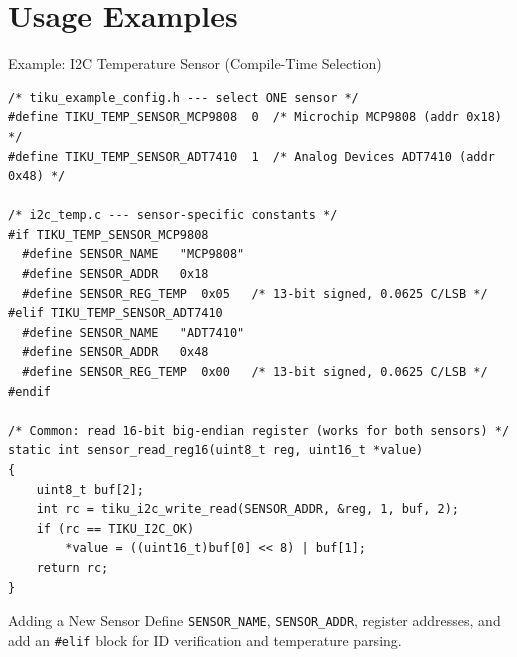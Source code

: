 \documentclass[aspectratio=169, 10pt]{beamer}
\begin{document}
\section{Usage Examples}

\begin{frame}[fragile]{Example: I2C Temperature Sensor (Compile-Time Selection)}
\begin{lstlisting}[style=cstyle, basicstyle=\ttfamily\tiny,
  title={Sensor-specific constants selected by \#define in tiku\_example\_config.h}]
/* tiku_example_config.h --- select ONE sensor */
#define TIKU_TEMP_SENSOR_MCP9808  0  /* Microchip MCP9808 (addr 0x18) */
#define TIKU_TEMP_SENSOR_ADT7410  1  /* Analog Devices ADT7410 (addr 0x48) */

/* i2c_temp.c --- sensor-specific constants */
#if TIKU_TEMP_SENSOR_MCP9808
  #define SENSOR_NAME   "MCP9808"
  #define SENSOR_ADDR   0x18
  #define SENSOR_REG_TEMP  0x05   /* 13-bit signed, 0.0625 C/LSB */
#elif TIKU_TEMP_SENSOR_ADT7410
  #define SENSOR_NAME   "ADT7410"
  #define SENSOR_ADDR   0x48
  #define SENSOR_REG_TEMP  0x00   /* 13-bit signed, 0.0625 C/LSB */
#endif

/* Common: read 16-bit big-endian register (works for both sensors) */
static int sensor_read_reg16(uint8_t reg, uint16_t *value)
{
    uint8_t buf[2];
    int rc = tiku_i2c_write_read(SENSOR_ADDR, &reg, 1, buf, 2);
    if (rc == TIKU_I2C_OK)
        *value = ((uint16_t)buf[0] << 8) | buf[1];
    return rc;
}
\end{lstlisting}

\vspace{0.3em}
\begin{alertblock}{Adding a New Sensor}
Define \texttt{SENSOR\_NAME}, \texttt{SENSOR\_ADDR}, register addresses, and
add an \texttt{\#elif} block for ID verification and temperature parsing.
\end{alertblock}
\end{frame}
\end{document}
